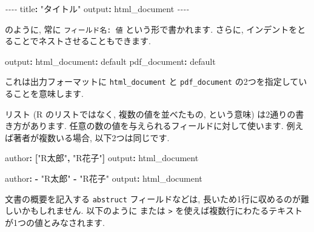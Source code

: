 \documentclass[
]{bxjsarticle}
\newenvironment{Shaded}{\begin{snugshade}}{\end{snugshade}}
\newcommand{\AttributeTok}[1]{\textcolor[rgb]{0.77,0.63,0.00}{#1}}
\newcommand{\FunctionTok}[1]{\textcolor[rgb]{0.00,0.00,0.00}{#1}}
\newcommand{\KeywordTok}[1]{\textcolor[rgb]{0.13,0.29,0.53}{\textbf{#1}}}
\newcommand{\PreprocessorTok}[1]{\textcolor[rgb]{0.56,0.35,0.01}{\textit{#1}}}
\newcommand{\StringTok}[1]{\textcolor[rgb]{0.31,0.60,0.02}{#1}}
\begin{document}
\begin{Shaded}
\begin{Highlighting}[numbers=left,,]
\PreprocessorTok{{-}{-}{-}{-}}
\FunctionTok{title}\KeywordTok{:}\AttributeTok{ }\StringTok{"タイトル"}
\FunctionTok{output}\KeywordTok{:}\AttributeTok{ html\_document}
\PreprocessorTok{{-}{-}{-}{-}}
\end{Highlighting}
\end{Shaded}

のように, 常に \texttt{フィールド名:\ 値} という形で書かれます. さらに, インデントをとることでネストさせることもできます.

\begin{Shaded}
\begin{Highlighting}[numbers=left,,]
\FunctionTok{output}\KeywordTok{:}
\AttributeTok{  }\FunctionTok{html\_document}\KeywordTok{:}\AttributeTok{ default}
\AttributeTok{  }\FunctionTok{pdf\_document}\KeywordTok{:}\AttributeTok{ default}
\end{Highlighting}
\end{Shaded}

これは出力フォーマットに \texttt{html\_document} と \texttt{pdf\_document} の2つを指定していることを意味します.

リスト (R のリストではなく, 複数の値を並べたもの, という意味) は2通りの書き方があります. 任意の数の値を与えられるフィールドに対して使います. 例えば著者が複数いる場合, 以下2つは同じです.

\begin{Shaded}
\begin{Highlighting}[numbers=left,,]
\FunctionTok{author}\KeywordTok{:}\AttributeTok{ }\KeywordTok{[}\StringTok{"R太郎"}\KeywordTok{,}\AttributeTok{ }\StringTok{"R花子"}\KeywordTok{]}
\FunctionTok{output}\KeywordTok{:}\AttributeTok{ html\_document}
\end{Highlighting}
\end{Shaded}

\begin{Shaded}
\begin{Highlighting}[numbers=left,,]
\FunctionTok{author}\KeywordTok{:}
\AttributeTok{  }\KeywordTok{{-}}\AttributeTok{  }\StringTok{"R太郎"}
\AttributeTok{  }\KeywordTok{{-}}\AttributeTok{  }\StringTok{"R花子"}
\FunctionTok{output}\KeywordTok{:}\AttributeTok{ html\_document}
\end{Highlighting}
\end{Shaded}

文書の概要を記入する \texttt{abstruct} フィールドなどは, 長いため1行に収めるのが難しいかもしれません. 以下のように \texttt{\textbar{}} または \texttt{\textgreater{}} を使えば複数行にわたるテキストが1つの値とみなされます.
\end{document}
